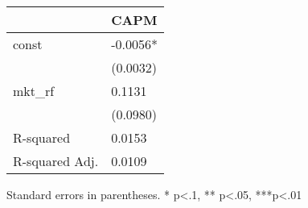 \begin{table}
\caption{}
\label{}
\begin{center}
\begin{tabular}{ll}
\hline
               & CAPM      \\
\hline
const          & -0.0056*  \\
               & (0.0032)  \\
mkt\_rf        & 0.1131    \\
               & (0.0980)  \\
R-squared      & 0.0153    \\
R-squared Adj. & 0.0109    \\
\hline
\end{tabular}
\end{center}
\end{table}
\bigskip
Standard errors in parentheses. \newline 
* p<.1, ** p<.05, ***p<.01
